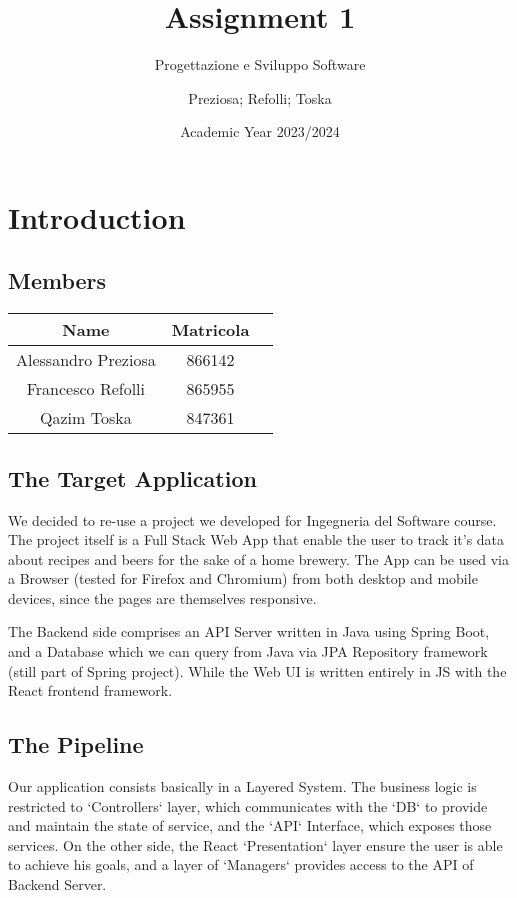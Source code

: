 \documentclass[a4paper,10pt]{scrartcl}
\title{Assignment 1}
\subtitle{Progettazione e Sviluppo Software}
\author{Preziosa; Refolli; Toska}
\date{Academic Year 2023/2024}
\begin{document}
\maketitle

\section{Introduction}

\subsection{Members}

\begin{center}
    \begin{tabular}{|c|c|c|}
        \hline
        Name & Matricola \\
        \hline
        Alessandro Preziosa & 866142 \\
        \hline
        Francesco Refolli & 865955 \\
        \hline
        Qazim Toska & 847361 \\
        \hline
    \end{tabular}
\end{center}

\subsection{The Target Application}

We decided to re-use a project we developed for Ingegneria del Software course. The project itself is a Full Stack Web App that enable the user to track it's data about recipes and beers for the sake of a home brewery. The App can be used via a Browser (tested for Firefox and Chromium) from both desktop and mobile devices, since the pages are themselves responsive.

The Backend side comprises an API Server written in Java using Spring Boot, and a Database which we can query from Java via JPA Repository framework (still part of Spring project). While the Web UI is written entirely in JS with the React frontend framework.

\subsection{The Pipeline}

Our application consists basically in a Layered System. The business logic is restricted to `Controllers` layer, which communicates with the `DB` to provide and maintain the state of service, and the `API` Interface, which exposes those services. On the other side, the React `Presentation` layer ensure the user is able to achieve his goals, and a layer of `Managers` provides access to the API of Backend Server.
\end{document}
